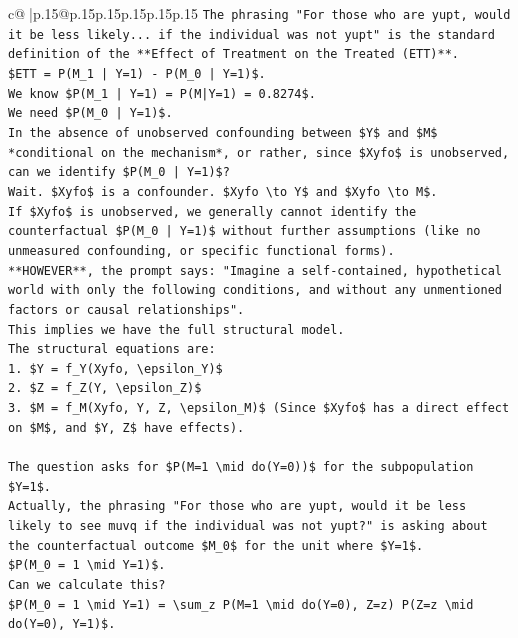 \documentclass{article}
\begin{document}
{\begin{supertabular}{c@{$\;$}|p{.15\linewidth}@{}p{.15\linewidth}p{.15\linewidth}p{.15\linewidth}p{.15\linewidth}p{.15\linewidth}}
{{{\texttt{The phrasing "For those who are yupt, would it be less likely... if the individual was not yupt" is the standard definition of the **Effect of Treatment on the Treated (ETT)**.} \\
\texttt{\$ETT = P(M\_1 | Y=1) {-} P(M\_0 | Y=1)\$.} \\
\texttt{We know \$P(M\_1 | Y=1) = P(M|Y=1) = 0.8274\$.} \\
\texttt{We need \$P(M\_0 | Y=1)\$.} \\
\texttt{In the absence of unobserved confounding between \$Y\$ and \$M\$ *conditional on the mechanism*, or rather, since \$Xyfo\$ is unobserved, can we identify \$P(M\_0 | Y=1)\$?} \\
\texttt{Wait. \$Xyfo\$ is a confounder. \$Xyfo \textbackslash{}to Y\$ and \$Xyfo \textbackslash{}to M\$.} \\
\texttt{If \$Xyfo\$ is unobserved, we generally cannot identify the counterfactual \$P(M\_0 | Y=1)\$ without further assumptions (like no unmeasured confounding, or specific functional forms).} \\
\texttt{**HOWEVER**, the prompt says: "Imagine a self{-}contained, hypothetical world with only the following conditions, and without any unmentioned factors or causal relationships".} \\
\texttt{This implies we have the full structural model.} \\
\texttt{The structural equations are:} \\
\texttt{1. \$Y = f\_Y(Xyfo, \textbackslash{}epsilon\_Y)\$} \\
\texttt{2. \$Z = f\_Z(Y, \textbackslash{}epsilon\_Z)\$} \\
\texttt{3. \$M = f\_M(Xyfo, Y, Z, \textbackslash{}epsilon\_M)\$ (Since \$Xyfo\$ has a direct effect on \$M\$, and \$Y, Z\$ have effects).} \\
\\ 
\texttt{The question asks for \$P(M=1 \textbackslash{}mid do(Y=0))\$ for the subpopulation \$Y=1\$.} \\
\texttt{Actually, the phrasing "For those who are yupt, would it be less likely to see muvq if the individual was not yupt?" is asking about the counterfactual outcome \$M\_0\$ for the unit where \$Y=1\$.} \\
\texttt{\$P(M\_0 = 1 \textbackslash{}mid Y=1)\$.} \\
\texttt{Can we calculate this?} \\
\texttt{\$P(M\_0 = 1 \textbackslash{}mid Y=1) = \textbackslash{}sum\_z P(M=1 \textbackslash{}mid do(Y=0), Z=z) P(Z=z \textbackslash{}mid do(Y=0), Y=1)\$.} \\
}}}
\end{supertabular}}
\end{document}
